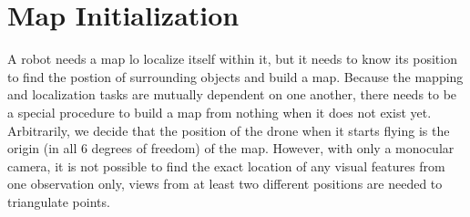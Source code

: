\section{Map Initialization}
A robot needs a map lo localize itself within it, but it needs to know its position to find the postion of surrounding objects and build a map. Because the mapping and localization tasks are mutually dependent on one another, there needs to be a special procedure to build a map from nothing when it does not exist yet. Arbitrarily, we decide that the position of the drone when it starts flying is the origin (in all 6 degrees of freedom) of the map. However, with only a monocular camera, it is not possible to find the exact location of any visual features from one observation only, views from at least two different positions are needed to triangulate points.
